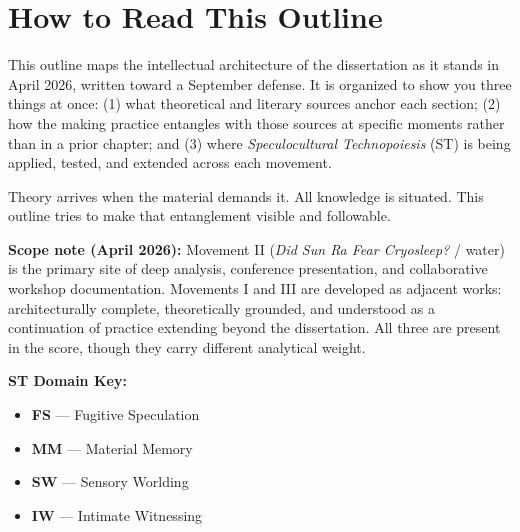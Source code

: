 %


\section*{How to Read This Outline}

This outline maps the intellectual architecture of the dissertation as it stands in April 2026, written toward a September defense. It is organized to show you three things at once: (1) what theoretical and literary sources anchor each section; (2) how the making practice entangles with those sources at specific moments rather than in a prior chapter; and (3) where \textit{Speculocultural Technopoiesis} (ST) is being applied, tested, and extended across each movement.

Theory arrives when the material demands it. All knowledge is situated. This outline tries to make that entanglement visible and followable.

\textbf{Scope note (April 2026):} Movement II (\textit{Did Sun Ra Fear Cryosleep?} / water) is the primary site of deep analysis, conference presentation, and collaborative workshop documentation. Movements I and III are developed as adjacent works: architecturally complete, theoretically grounded, and understood as a continuation of practice extending beyond the dissertation. All three are present in the score, though they carry different analytical weight.

\medskip
\noindent\textbf{ST Domain Key:}
\begin{itemize}[noitemsep]
    \item \textbf{FS} --- Fugitive Speculation
    \item \textbf{MM} --- Material Memory
    \item \textbf{SW} --- Sensory Worlding
    \item \textbf{IW} --- Intimate Witnessing
\end{itemize}

